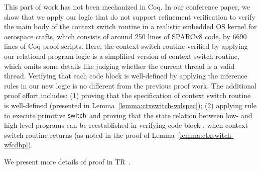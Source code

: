 This part of work has not been mechanized in Coq.
In our conference paper, we show that
we apply our logic that do not support
refinement verification to verify
the main body of the context switch routine in
a realistic embedded OS kernel for aerospace crafts,
which consists of around 250 lines of SPARCv8 code,
by 6690 lines of Coq proof scripts. Here, the
context switch routine verified by applying our
relational program logic is a
simplified version of context switch routine,
which omits some details like judging whether the
current thread is a valid thread.
Verifying that each code block is well-defined
by applying the inference rules in our new logic is
no different from the previous proof work.
The additional proof effort includes:
(1) proving that the specification of context
switch routine is well-defined (presented in
Lemma~\ref{lemma:ctxswitch-wdspec});
(2) applying  rule to execute
primitive $\mathsf{switch}$ and proving that the state
relation between low- and high-level programs
can be reestablished in verifying code block
\SwitchNewTask{}, when context switch routine
returns (as noted in the proof of
Lemma~\ref{lemma:ctxswitch-wfcdhp}).

We present more details of proof in TR~\cite{coqimp}.